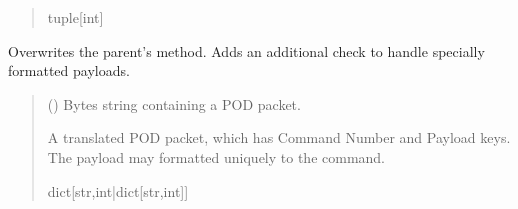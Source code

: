 \documentclass[letterpaper,10pt,english]{sphinxmanual}
\begin{document}
\begin{fulllineitems}
\begin{fulllineitems}
\begin{quote}
\begin{description}
\sphinxAtStartPar
tuple{[}int{]}

\end{description}\end{quote}

\end{fulllineitems}


\begin{fulllineitems}
\label{\detokenize{PodDevice_8229:PodDevice_8229.POD_8229.TranslatePODpacket}}
\pysigstartsignatures
{}
\pysigstopsignatures
\sphinxAtStartPar
Overwrites the parent’s method. Adds an additional check to handle specially formatted         payloads.
\begin{quote}\begin{description}
\sphinxAtStartPar
{} () \textendash{} Bytes string containing a POD packet.

\sphinxAtStartPar
A translated POD packet, which has Command Number and Payload                 keys. The payload may formatted uniquely to the command.

\sphinxAtStartPar
dict{[}str,int|dict{[}str,int{]}{]}

\end{description}\end{quote}

\end{fulllineitems}



\end{fulllineitems}
\end{document}
